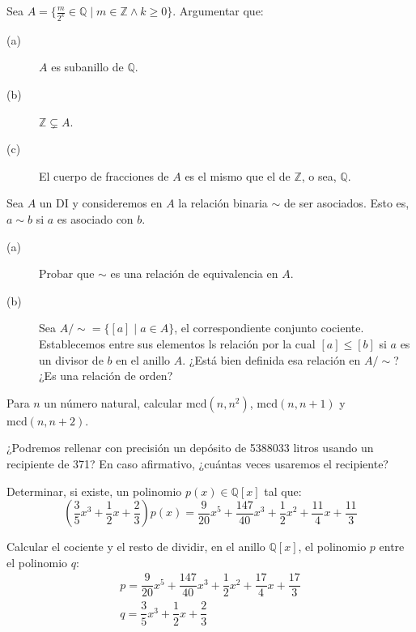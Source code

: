 \begin{ejercicio}
    Sea $A=\{ \frac{m}{2^k} \in \mathbb{Q} \mid m \in \mathbb{Z} \land k \geq 0\}$. Argumentar que:
    \begin{description}
        \item [(a)] $A$ es subanillo de $\mathbb{Q}$.
        \item [(b)] $\mathbb{Z}\subsetneq A$.
        \item [(c)] El cuerpo de fracciones de $A$ es el mismo que el de $\mathbb{Z}$, o sea, $\mathbb{Q}$.
    \end{description}
\end{ejercicio}

\begin{ejercicio}
    Sea $A$ un DI y consideremos en $A$ la relación binaria $\sim$ de ser asociados. Esto es, $a\sim b$ si $a$ es asociado con $b$.
    \begin{description}
        \item [(a)] Probar que $\sim$ es una relación de equivalencia en $A$.
        \item [(b)] Sea $A/\sim = \{[a] \mid a\in A\}$, el correspondiente conjunto cociente. Establecemos entre sus elementos ls relación por la cual $[a]\leq [b]$ si $a$ es un divisor de $b$ en el anillo $A$. ¿Está bien definida esa relación en $A/\sim$? ¿Es una relación de orden?
    \end{description}
\end{ejercicio}

\begin{ejercicio}
    Para $n$ un número natural, calcular $\text{mcd}(n,n^2)$, $\text{mcd}(n,n+1)$ y $\text{mcd}(n,n+2)$.
\end{ejercicio}

\begin{ejercicio}
    ¿Podremos rellenar con precisión un depósito de 5388033 litros usando un recipiente de 371? En caso afirmativo, ¿cuántas veces usaremos el recipiente?
\end{ejercicio}

\begin{ejercicio}
    Determinar, si existe, un polinomio $p(x)\in \mathbb{Q}[x]$ tal que:
    \begin{equation*}
        \left(\dfrac{3}{5}x^3+\dfrac{1}{2}x+\dfrac{2}{3}\right)p(x) = \dfrac{9}{20}x^5 + \dfrac{147}{40}x^3+\dfrac{1}{2}x^2+\dfrac{11}{4}x+\dfrac{11}{3}
    \end{equation*}
\end{ejercicio}

\begin{ejercicio}
    Calcular el cociente y el resto de dividir, en el anillo $\mathbb{Q}[x]$, el polinomio $p$ entre el polinomio $q$:
    \begin{gather*}
        p = \dfrac{9}{20}x^5 + \dfrac{147}{40}x^3+\dfrac{1}{2}x^2+\dfrac{17}{4}x+\dfrac{17}{3} \\
        q = \dfrac{3}{5}x^3+\dfrac{1}{2}x+\dfrac{2}{3}
    \end{gather*}
\end{ejercicio}
